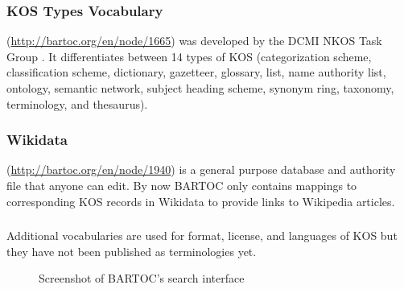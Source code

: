 \documentclass[12pt,a4paper]{llncs}
\begin{document}
\subsubsection{KOS Types Vocabulary}
(\href{http://bartoc.org/en/node/1665}{http://bartoc.org/en/node/1665})
was developed by the DCMI NKOS Task Group \cite{KOSTypes}. It differentiates between 14 types of KOS (categorization scheme, classification scheme, dictionary, gazetteer, glossary, list, name authority list, ontology, semantic network, subject heading scheme, synonym ring, taxonomy, terminology, and thesaurus).

\subsubsection{Wikidata}
(\href{http://bartoc.org/en/node/1940}{http://bartoc.org/en/node/1940})
is a general purpose database and authority file that anyone can edit. By now BARTOC only contains mappings to corresponding KOS records in Wikidata to provide links to Wikipedia articles.

\subsubsection{}\hspace{-0.4em}%
Additional vocabularies are used for format, license, and languages of KOS but they have not been published as terminologies yet.
\pagebreak

\begin{figure}\centering
{}
\caption{Screenshot of BARTOC's search interface}
\end{figure}
\end{document}
